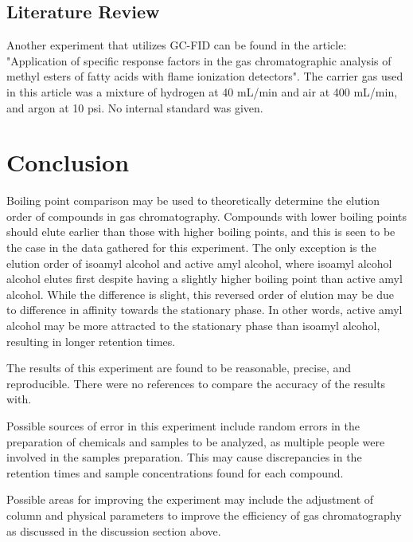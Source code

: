 \documentclass{article}
\begin{document}
\begin{multicols}{2}
{\subsection*{Literature Review}
Another experiment that utilizes GC-FID can be found in the article:
"Application of specific response factors in the gas chromatographic analysis of
methyl esters of fatty acids with flame ionization detectors".\cite{ref}
The carrier gas used in this article was a mixture of hydrogen at 40 mL/min and air at 400
mL/min, and argon at 10 psi. No internal standard was given.

\section*{Conclusion}
Boiling point comparison may be used to theoretically determine the elution
order of compounds in gas chromatography. Compounds with lower boiling points
should elute earlier than those with higher boiling points, and this is seen to
be the case in the data gathered for this experiment. The only exception is the
elution order of isoamyl alcohol and active amyl alcohol, where isoamyl alcohol
alcohol elutes first despite having a slightly higher boiling point than active
amyl alcohol. While the difference is slight, this reversed order of elution may
be due to difference in affinity towards the stationary phase. In other words,
active amyl alcohol may be more attracted to the stationary phase than isoamyl
alcohol, resulting in longer retention times.

The results of this experiment are found to be reasonable, precise, and reproducible. There
were no references to compare the accuracy of the results with.

Possible sources of error in this experiment include random errors in the
preparation of chemicals and samples to be analyzed, as multiple people were
involved in the samples preparation. This may cause discrepancies in the
retention times and sample concentrations found for each compound.

Possible areas for improving the experiment may include the adjustment of column
and physical parameters to improve the efficiency of gas chromatography as
discussed in the discussion section above.




}
\end{multicols}



\newpage
\end{document}
